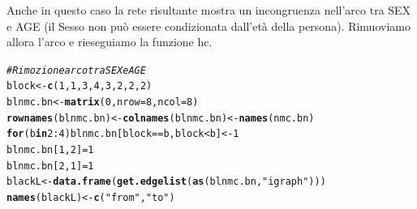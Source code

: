 \documentclass{article}\usepackage[]{graphicx}\usepackage[]{xcolor}
\makeatletter
\newcommand{\hlnum}[1]{\textcolor[rgb]{0.686,0.059,0.569}{#1}}%
\newcommand{\hlstr}[1]{\textcolor[rgb]{0.192,0.494,0.8}{#1}}%
\newcommand{\hlcom}[1]{\textcolor[rgb]{0.678,0.584,0.686}{\textit{#1}}}%
\newcommand{\hlopt}[1]{\textcolor[rgb]{0,0,0}{#1}}%
\newcommand{\hlstd}[1]{\textcolor[rgb]{0.345,0.345,0.345}{#1}}%
\newcommand{\hlkwa}[1]{\textcolor[rgb]{0.161,0.373,0.58}{\textbf{#1}}}%
\newcommand{\hlkwb}[1]{\textcolor[rgb]{0.69,0.353,0.396}{#1}}%
\newcommand{\hlkwc}[1]{\textcolor[rgb]{0.333,0.667,0.333}{#1}}%
\newcommand{\hlkwd}[1]{\textcolor[rgb]{0.737,0.353,0.396}{\textbf{#1}}}%
\newenvironment{kframe}{%
 \def\at@end@of@kframe{}%
 \ifinner\ifhmode%
  \def\at@end@of@kframe{\end{minipage}}%
  \begin{minipage}{\columnwidth}%
 \fi\fi%
 \def\FrameCommand##1{\hskip\@totalleftmargin \hskip-\fboxsep
 \colorbox{shadecolor}{##1}\hskip-\fboxsep
     \hskip-\linewidth \hskip-\@totalleftmargin \hskip\columnwidth}%
 \MakeFramed {\advance\hsize-\width
   \@totalleftmargin\z@ \linewidth\hsize
   \@setminipage}}%
 {\par\unskip\endMakeFramed%
 \at@end@of@kframe}
\newenvironment{knitrout}{}{} %
\makeatother
\begin{document}
      Anche in questo caso la rete risultante mostra un incongruenza nell'arco
      tra SEX e AGE (il Sesso non può essere condizionata dall'età della persona).
      Rimuoviamo allora l'arco e rieseguiamo la funzione hc.
      
\begin{knitrout}
\color{fgcolor}\begin{kframe}
\begin{alltt}
\hlcom{#Rimozione arco tra SEX e AGE}
\hlstd{block}\hlkwb{<-}\hlkwd{c}\hlstd{(}\hlnum{1}\hlstd{,} \hlnum{1}\hlstd{,} \hlnum{3}\hlstd{,} \hlnum{4}\hlstd{,} \hlnum{3}\hlstd{,} \hlnum{2}\hlstd{,} \hlnum{2}\hlstd{,} \hlnum{2}\hlstd{)}
\hlstd{blnmc.bn} \hlkwb{<-} \hlkwd{matrix}\hlstd{(}\hlnum{0}\hlstd{,} \hlkwc{nrow}\hlstd{=}\hlnum{8}\hlstd{,} \hlkwc{ncol}\hlstd{=}\hlnum{8}\hlstd{)}
\hlkwd{rownames}\hlstd{(blnmc.bn)} \hlkwb{<-} \hlkwd{colnames}\hlstd{(blnmc.bn)} \hlkwb{<-} \hlkwd{names}\hlstd{(nmc.bn)}
\hlkwa{for} \hlstd{(b} \hlkwa{in} \hlnum{2}\hlopt{:}\hlnum{4}\hlstd{) blnmc.bn[block}\hlopt{==}\hlstd{b, block}\hlopt{<}\hlstd{b]} \hlkwb{<-} \hlnum{1}
\hlstd{blnmc.bn[}\hlnum{1}\hlstd{,}\hlnum{2}\hlstd{]} \hlkwb{=} \hlnum{1}
\hlstd{blnmc.bn[}\hlnum{2}\hlstd{,}\hlnum{1}\hlstd{]} \hlkwb{=} \hlnum{1}
\hlstd{blackL} \hlkwb{<-} \hlkwd{data.frame}\hlstd{(}\hlkwd{get.edgelist}\hlstd{(}\hlkwd{as}\hlstd{(blnmc.bn,} \hlstr{"igraph"}\hlstd{)))}
\hlkwd{names}\hlstd{(blackL)} \hlkwb{<-} \hlkwd{c}\hlstd{(}\hlstr{"from"}\hlstd{,} \hlstr{"to"}\hlstd{)}
\end{alltt}
\end{kframe}
\end{knitrout}
\end{document}
